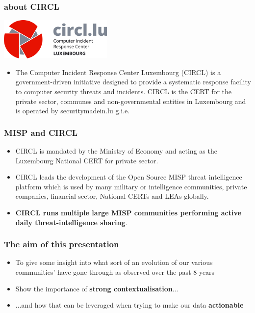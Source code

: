 
\begin{frame}
\titlepage
\end{frame}

\begin{frame}
  \frametitle{about CIRCL}
  \includegraphics[scale=0.4]{circl.png}
  \begin{itemize}
    \item The Computer Incident Response Center Luxembourg (CIRCL) is a government-driven initiative designed to provide a systematic response facility to computer security threats and incidents. CIRCL is the CERT for the private sector, communes and non-governmental entities in Luxembourg and is operated by securitymadein.lu g.i.e.
  \end{itemize}
\end{frame}

\begin{frame}
  \frametitle{MISP and CIRCL}
  \begin{itemize}
    \item CIRCL is mandated by the Ministry of Economy and acting as the Luxembourg National CERT for private sector.
    \item CIRCL leads the development of the Open Source MISP threat intelligence platform which is used by many military or intelligence communities, private companies, financial sector, National CERTs and LEAs globally.
    \item {\bf CIRCL runs multiple large MISP communities performing active daily threat-intelligence sharing}.
  \end{itemize}
\end{frame}

\begin{frame}
  \frametitle{The aim of this presentation}
  \begin{itemize}
     \item To give some insight into what sort of an evolution of our various communities' have gone through as observed over the past 8 years
     \item Show the importance of {\bf strong contextualisation}...
     \item ...and how that can be leveraged when trying to make our data {\bf actionable}
  \end{itemize}
\end{frame}

